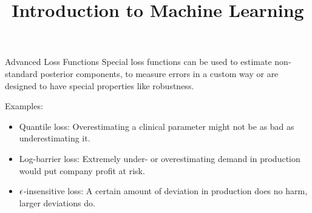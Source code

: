\documentclass[11pt,compress,t,notes=noshow, xcolor=table]{beamer}
\title{Introduction to Machine Learning}
\begin{document}
    

\begin{vbframe}{Advanced Loss Functions}
Special loss functions can be used to estimate non-standard posterior components, 
    to measure errors in a custom way or are designed to have special properties like robustness.

\vspace{1cm}

Examples:
\begin{itemize}
\item Quantile loss: Overestimating a clinical parameter might not be as bad as underestimating it.
\item Log-barrier loss: Extremely under- or overestimating demand in production would put company profit at risk.
\item $\epsilon$-insensitive loss: A certain amount of deviation in production does no harm, larger deviations do.
\end{itemize}
\end{vbframe}
\end{document}
